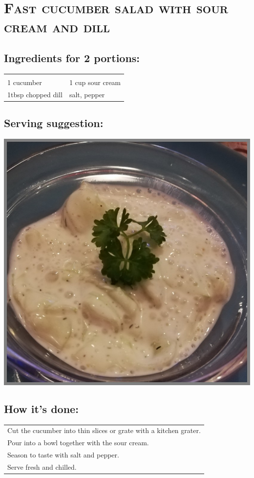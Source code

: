 \section{\textsc{Fast cucumber salad with sour cream and dill}}

\subsection*{Ingredients for 2 portions:}

\begin{tabular}{p{7.5cm} p{7.5cm}}
	& \\
	1 cucumber & 1 cup sour cream \\
	1tbsp chopped dill & salt, pepper
\end{tabular}

\subsection*{Serving suggestion:}

\includegraphics[width=\textwidth]{img/schneller_gurkensalat.jpg} \cite{gurkensalatdill}

\subsection*{How it's done:}

\begin{tabular}{p{15cm}}
	\\
  Cut the cucumber into thin slices or grate with a kitchen grater.\\
  Pour into a bowl together with the sour cream.\\
  Season to taste with salt and pepper.\\
  Serve fresh and chilled.
\end{tabular}
